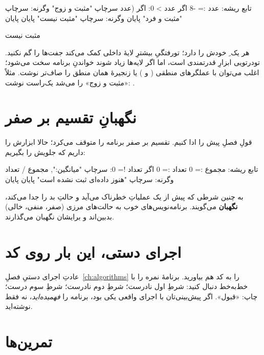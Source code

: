 \begin{salamfa}
تابع ریشه:
    عدد := -8
    اگر عدد > 0:
        اگر (عدد %
            سرچاپ "مثبت و زوج"
        وگرنه:
            سرچاپ "مثبت و فرد"
        پایان
    وگرنه:
        سرچاپ "مثبت نیست"
    پایان
پایان
\end{salamfa}

\begin{progoutfa}
مثبت نیست
\end{progoutfa}

هر  یک ِ خودش را دارد؛ تورفتگیِ بیشترِ لایهٔ داخلی
کمک می‌کند جفت‌ها را گم نکنید. تودرتویی ابزارِ قدرتمندی است، اما اگر
لایه‌ها زیاد شوند خواندنِ برنامه سخت می‌شود؛ اغلب می‌توان با عملگرهای
منطقی ( و ) یا زنجیرهٔ  همان منطق را
صاف‌تر نوشت. مثلاً «مثبت و زوج» را می‌شد یک‌راست نوشت:
.

\section{نگهبانِ تقسیم بر صفر}

قولِ فصلِ پیش را ادا کنیم. تقسیم بر صفر برنامه را متوقف می‌کرد؛ حالا
ابزارش را داریم که جلویش را بگیریم:

\begin{salamfa}
تابع ریشه:
    مجموع := 0
    تعداد := 0
    اگر تعداد != 0:
        سرچاپ "میانگین:", مجموع / تعداد
    وگرنه:
        سرچاپ "هنوز داده‌ای ثبت نشده است"
    پایان
پایان
\end{salamfa}

به چنین شرطی که پیش از یک عملیاتِ خطرناک می‌آید و حالتِ بد را جدا می‌کند،
\textbf{نگهبان} می‌گویند. برنامه‌نویس‌های خوب به حالت‌های مرزی (صفر، منفی،
خالی) بدبین‌اند و برایشان نگهبان می‌گذارند.

\section{اجرای دستی، این بار روی کد}

عادتِ اجرای دستیِ فصلِ~\ref{ch:algorithms} را به کد هم بیاورید. برنامهٔ
نمره را با  خط‌به‌خط دنبال کنید: شرطِ اول 
نادرست؛ شرطِ دوم  نادرست؛ شرطِ سوم  درست؛
چاپ: «قبول». اگر پیش‌بینی‌تان با اجرای واقعی یکی بود، برنامه را
\emph{فهمیده‌اید}، نه فقط نوشته‌اید.

\section{تمرین‌ها}

